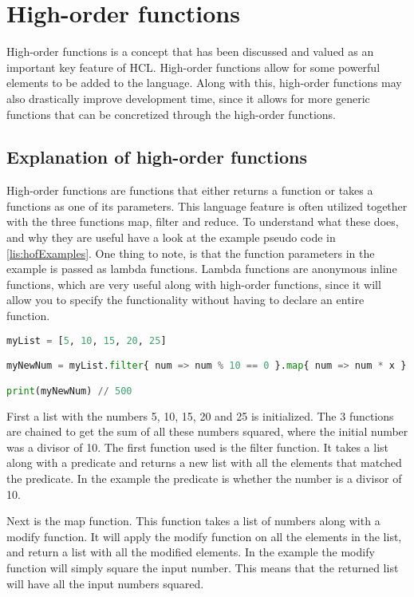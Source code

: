 \section{High-order functions}

High-order functions is a concept that has been discussed and valued as an important key feature of HCL.
High-order functions allow for some powerful elements to be added to the language.
Along with this, high-order functions may also drastically improve development time, since it allows for more generic functions that can be concretized through the high-order functions.

\subsection{Explanation of high-order functions}
High-order functions are functions that either returns a function or takes a functions as one of its parameters. 
This language feature is often utilized together with the three functions map, filter and reduce. 
To understand what these does, and why they are useful have a look at the example pseudo code in \ref{lis:hofExamples}. 
One thing to note, is that the function parameters in the example is passed as lambda functions. 
Lambda functions are anonymous inline functions, which are very useful along with high-order functions, since it will allow you to specify the functionality without having to declare an entire function.

\begin{lstlisting}[language=Python,label=lis:hofExamples,caption=An example of the map\, filter and reduce functions.,firstnumber=1]
myList = [5, 10, 15, 20, 25]

myNewNum = myList.filter{ num => num % 10 == 0 }.map{ num => num * x }.reduce{ sumOfNums, num => sumOfNums + num }

print(myNewNum) // 500
\end{lstlisting}

First a list with the numbers 5, 10, 15, 20 and 25 is initialized. 
The 3 functions are chained to get the sum of all these numbers squared, where the initial number was a divisor of 10.
The first function used is the filter function. 
It takes a list along with a predicate and returns a new list with all the elements that matched the predicate. In the example the predicate is whether the number is a divisor of 10.

Next is the map function. 
This function takes a list of numbers along with a modify function. 
It will apply the modify function on all the elements in the list, and return a list with all the modified elements.
In the example the modify function will simply square the input number. 
This means that the returned list will have all the input numbers squared.


